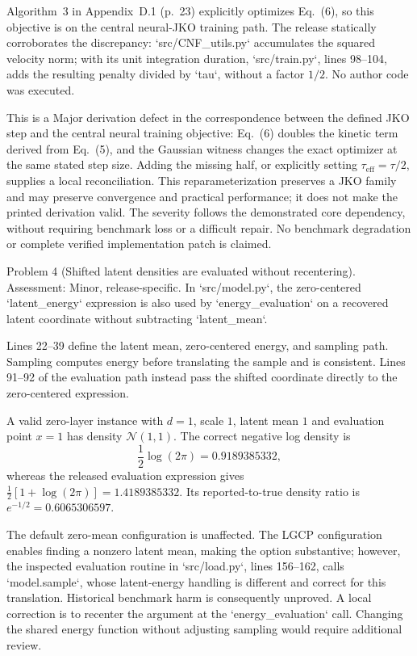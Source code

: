\documentclass[10pt]{article}
\begin{document}
Algorithm 3 in Appendix D.1 (p. 23) explicitly optimizes Eq. (6), so this objective is on the central neural-JKO training path. The release statically corroborates the discrepancy: `src/CNF\_utils.py` accumulates the squared velocity norm; with its unit integration duration, `src/train.py`, lines 98–104, adds the resulting penalty divided by `tau`, without a factor \(1/2\). No author code was executed.\par
This is a Major derivation defect in the correspondence between the defined JKO step and the central neural training objective: Eq. (6) doubles the kinetic term derived from Eq. (5), and the Gaussian witness changes the exact optimizer at the same stated step size. Adding the missing half, or explicitly setting \(\tau_{\mathrm{eff}}=\tau/2\), supplies a local reconciliation. This reparameterization preserves a JKO family and may preserve convergence and practical performance; it does not make the printed derivation valid. The severity follows the demonstrated core dependency, without requiring benchmark loss or a difficult repair. No benchmark degradation or complete verified implementation patch is claimed.\par
Problem 4 (Shifted latent densities are evaluated without recentering).  Assessment: Minor, release-specific. In `src/model.py`, the zero-centered `latent\_energy` expression is also used by `energy\_evaluation` on a recovered latent coordinate without subtracting `latent\_mean`.\par
Lines 22–39 define the latent mean, zero-centered energy, and sampling path. Sampling computes energy before translating the sample and is consistent. Lines 91–92 of the evaluation path instead pass the shifted coordinate directly to the zero-centered expression.\par
A valid zero-layer instance with \(d=1\), scale \(1\), latent mean \(1\) and evaluation point \(x=1\) has density \(\mathcal N(1,1)\). The correct negative log density is \[\frac12\log(2\pi)=0.9189385332,\] whereas the released evaluation expression gives \(\frac12[1+\log(2\pi)]=1.4189385332\). Its reported-to-true density ratio is \(e^{-1/2}=0.6065306597\).\par
The default zero-mean configuration is unaffected. The LGCP configuration enables finding a nonzero latent mean, making the option substantive; however, the inspected evaluation routine in `src/load.py`, lines 156–162, calls `model.sample`, whose latent-energy handling is different and correct for this translation. Historical benchmark harm is consequently unproved. A local correction is to recenter the argument at the `energy\_evaluation` call. Changing the shared energy function without adjusting sampling would require additional review.\par
\end{document}
